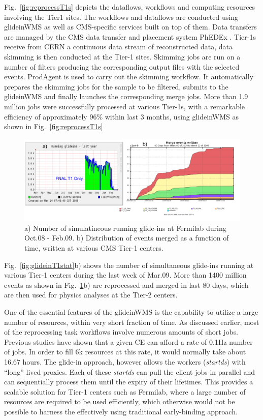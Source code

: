 \documentclass[a4paper]{jpconf}
\begin{document}
Fig.~\ref{fig:reprocessT1s} depicts the dataflows, workflows and computing resources involving the Tier1 sites.
The workflows and dataflows are conducted using glideinWMS  as well as CMS-specific services 
built on top of them. Data transfers are managed by the CMS data transfer and placement 
system PhEDEx \cite{bib:cms_phedex}. Tier-1s receive from CERN a continuous data stream of reconstructed data, data skimming 
is then conducted at the Tier-1 sites. Skimming jobs are run on a number of filters producing the 
corresponding output files with the selected events. ProdAgent is used to carry out the skimming workflow. 
It automatically prepares the skimming jobs for the sample to be filtered, submits to the glideinWMS and finally
launches the corresponding merge jobs. More than 1.9 million jobs were successfully processed at various 
Tier-1s, with a remarkable efficiency of approximately 96\% within last 3 months, using glideinWMS as shown 
in Fig.~\ref{fig:reprocessT1s}
\begin{figure}
\begin{center}
\includegraphics[scale=0.55]{merged_events}
\end{center}
\caption{a) Number of simulatineous running glide-ins at Fermilab during Oct.08 - Feb.09. b) Distribution of 
events merged as a function of time, written at various CMS Tier-1 centers.}
\label{fig:merged_events}
\end{figure}
Fig.~\ref{fig:glideinT1stat}b) shows the number of simultaneous glide-ins running at various Tier-1 centers during the last week of Mar.09. 
More than 1400 million events as shown in Fig.~\ref{fig:merged_events}b) are reprocessed and merged in last 80 days, which are then 
used for physics analyses at the Tier-2 centers. 

One of the essential features of the glideinWMS is the capability to utilize a large number of
resources, within very short fraction of time. As discussed earlier, most of the reprocessing task 
workflows involve numerous amounts of short jobs. Previous studies have shown that a given CE can 
afford a rate of \~0.1Hz number of jobs. In order to fill 6k resources at this rate, it would normally take 
about 16.67 hours.  The glide-in approach, however allows the workers (\emph{startds}) with ``long'' lived proxies. 
Each of these \emph{startds} can pull the client jobs in parallel and can sequentially process them until 
the expiry of their lifetimes. This provides a scalable solution for Tier-1 centers such as Fermilab, 
where a large number of resources are required to be used efficiently, which otherwise would not 
be possible to harness the effectively using traditional early-binding approach.
\end{document}
